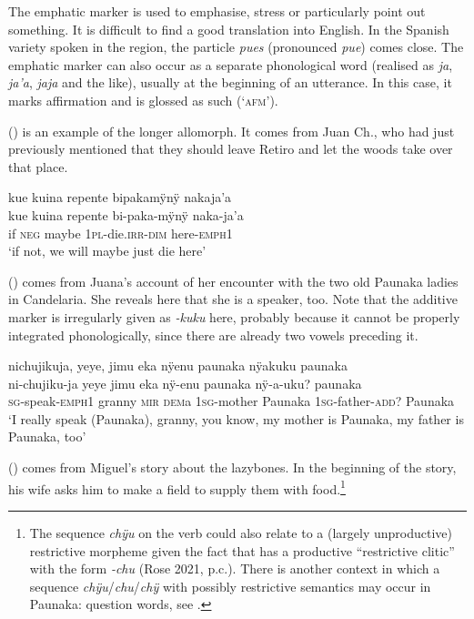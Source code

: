 The emphatic marker is used to emphasise, stress or particularly point out something. It is difficult to find a good translation into English. In the Spanish variety spoken in the region, the particle \textit{pues} (pronounced \textit{pue}) comes close. The emphatic marker can also occur as a separate phonological word (realised as \textit{ja}, \textit{ja’a}, \textit{jaja} and the like), usually at the beginning of an utterance. In this case, it marks affirmation and is glossed as such (‘\textsc{afm}’).

() is an example of the longer allomorph. It comes from Juan Ch., who had just previously mentioned that they should leave Retiro and let the woods take over that place.

\ea\label{ex:emphi-1}
\begingl
\glpreamble kue kuina repente bipakamÿnÿ nakaja’a\\
\gla kue kuina repente bi-paka-mÿnÿ naka-ja’a\\
\glb if \textsc{neg} maybe 1\textsc{pl}-die.\textsc{irr}-\textsc{dim} here-\textsc{emph}1\\
\glft ‘if not, we will maybe just die here’
\endgl
\trailingcitation{[nxx-p630101g-1.123]}
\xe


() comes from Juana’s account of her encounter with the two old Paunaka ladies in Candelaria. She reveals here that she is a speaker, too. Note that the additive marker is irregularly given as \textit{-kuku} here, probably because it cannot be properly integrated phonologically, since there are already two vowels preceding it.

\ea\label{ex:emphi-2}
\begingl
\glpreamble nichujikuja, yeye, jimu eka nÿenu paunaka nÿakuku paunaka\\
\gla ni-chujiku-ja yeye jimu eka nÿ-enu paunaka nÿ-a-uku? paunaka\\
\textsc{sg}-speak-\textsc{emph}1 granny \textsc{mir} \textsc{dem}a 1\textsc{sg}-mother Paunaka 1\textsc{sg}-father-\textsc{add}? Paunaka\\
\glft ‘I really speak (Paunaka), granny, you know, my mother is Paunaka, my father is Paunaka, too’
\endgl
\trailingcitation{[jxx-p120515l-1.161]}
\xe

() comes from Miguel’s story about the lazybones. In the beginning of the story, his wife asks him to make a field to supply them with food.\footnote{The sequence \textit{chÿu} on the verb could also relate to a (largely unproductive) restrictive morpheme given the fact that  has a productive “restrictive clitic” with the form \textit{-chu} (Rose 2021, p.c.). There is another context in which a sequence \textit{chÿu}/\textit{chu}/\textit{chÿ} with possibly restrictive semantics may occur in Paunaka: question words, see .}

